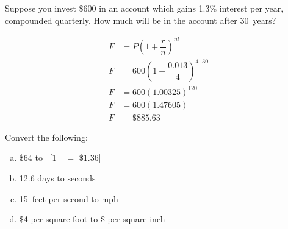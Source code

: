 \documentclass[11pt,letterpaper]{article}
\begin{document}
\newpage



 Suppose you invest \$600 in an account which gains 1.3\% interest per year, compounded quarterly. How much will be in the account after 30~years? \pspace

\sol
	\[
	\begin{aligned}
	F&= P \left(1 + \dfrac{r}{n} \right)^{nt} \\[0.3cm]
	F&= 600 \left(1 + \dfrac{0.013}{4} \right)^{4 \cdot 30} \\[0.3cm]
	F&= 600 (1.00325)^{120} \\[0.3cm]
	F&= 600(1.47605) \\[0.3cm]
	F&= \$885.63
	\end{aligned}
	\]



\newpage



 Convert the following:
	\begin{enumerate}[(a)]
	\item \$64 to \textsterling\ [1~\textsterling\ $=$ \$1.36]
	\item 12.6 days to seconds
	\item 15~feet per second to mph \textsterling
	\item \$4 per square foot to \$ per square inch
	\end{enumerate} \pspace
\end{document}
